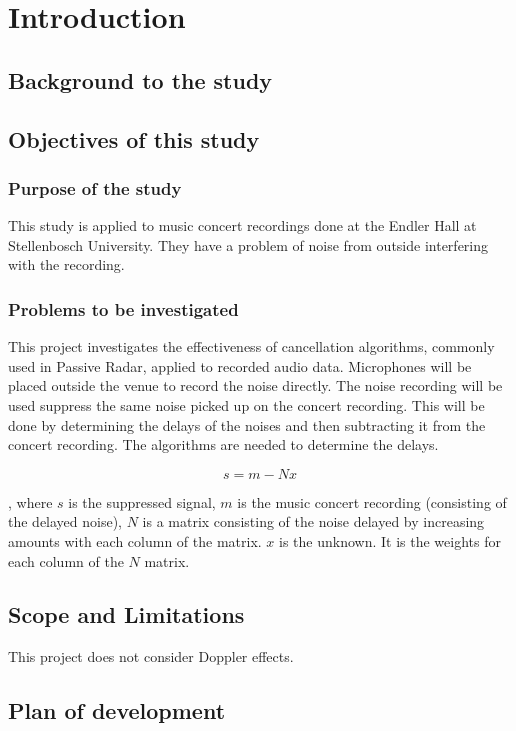 \chapter{Introduction}

\section{Background to the study}

\section{Objectives of this study}

\subsection{Purpose of the study}
	This study is applied to music concert recordings done at the Endler Hall at Stellenbosch University. They have a problem of noise from outside interfering with the recording.

 \subsection{Problems to be investigated}
	This project investigates the effectiveness of cancellation algorithms, commonly used in Passive Radar, applied to recorded audio data.
  Microphones will be placed outside the venue to record the noise directly. The noise recording will be used suppress the same noise picked up on the concert recording. This will be done by determining the delays of the noises and then subtracting it from the concert recording. The algorithms are needed to determine the delays.

  \[s=m-Nx\]

  , where $s$ is the suppressed signal, $m$ is the music concert recording (consisting of the delayed noise), $N$ is a matrix consisting of the noise delayed by increasing amounts with each column of the matrix. $x$ is the unknown. It is the weights for each column of the $N$ matrix.


\section{Scope and Limitations}
	
	This project does not consider Doppler effects.
	

\section{Plan of development}

